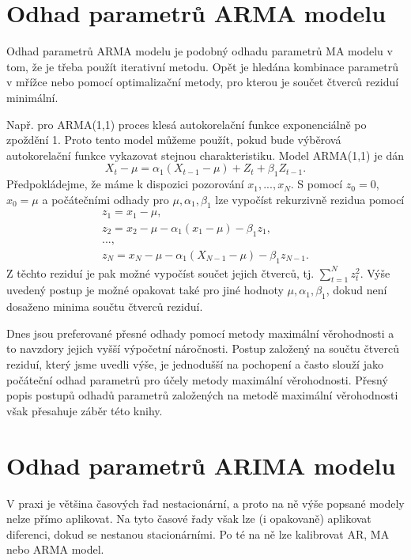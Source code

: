 \section{Odhad parametrů ARMA modelu}

Odhad parametrů ARMA modelu je podobný odhadu parametrů MA modelu v tom, že je třeba použít iterativní metodu. Opět je hledána kombinace parametrů v mřížce nebo pomocí optimalizační metody, pro kterou je součet čtverců reziduí minimální.

Např. pro ARMA(1,1) proces klesá autokorelační funkce exponenciálně po zpoždění 1. Proto tento model můžeme použít, pokud bude výběrová autokorelační funkce vykazovat stejnou charakteristiku. Model ARMA(1,1) je dán
\begin{equation}
X_t - \mu = \alpha_1 (X_{t-1} - \mu) + Z_t + \beta_1 Z_{t-1}.
\end{equation}
Předpokládejme, že máme k dispozici pozorování $x_1, ..., x_N$. S pomocí $z_0 = 0$, $x_0 = \mu$ a počátečními odhady pro $\mu, \alpha_1, \beta_1$ lze vypočíst rekurzivně rezidua pomocí
\begin{equation}
\begin{aligned}
z_1 = x_1 - \mu,\\
z_2 = x_2 - \mu - \alpha_1(x_1 - \mu) - \beta_1 z_1,\\
...,\\
z_N = x_N - \mu - \alpha_1(X_{N-1} - \mu) - \beta_1 z_{N-1}.
\end{aligned}
\end{equation}
Z těchto reziduí je pak možné vypočíst součet jejich čtverců, tj. $\sum_{t = 1}^N z_t^2$. Výše uvedený postup je možné opakovat také pro jiné hodnoty $\mu, \alpha_1, \beta_1$, dokud není dosaženo minima součtu čtverců reziduí.

Dnes jsou preferované přesné odhady pomocí metody maximální věrohodnosti a to navzdory jejich vyšší výpočetní náročnosti. Postup založený na součtu čtverců reziduí, který jsme uvedli výše, je jednodušší na pochopení a často slouží jako počáteční odhad parametrů pro účely metody maximální věrohodnosti. Přesný popis postupů odhadů parametrů založených na metodě maximální věrohodnosti však přesahuje záběr této knihy.

\section{Odhad parametrů ARIMA modelu}

V praxi je většina časových řad nestacionární, a proto na ně výše popsané modely nelze přímo aplikovat. Na tyto časové řady však lze (i opakovaně) aplikovat diferenci, dokud se nestanou stacionárními. Po té na ně lze kalibrovat AR, MA nebo ARMA model.

